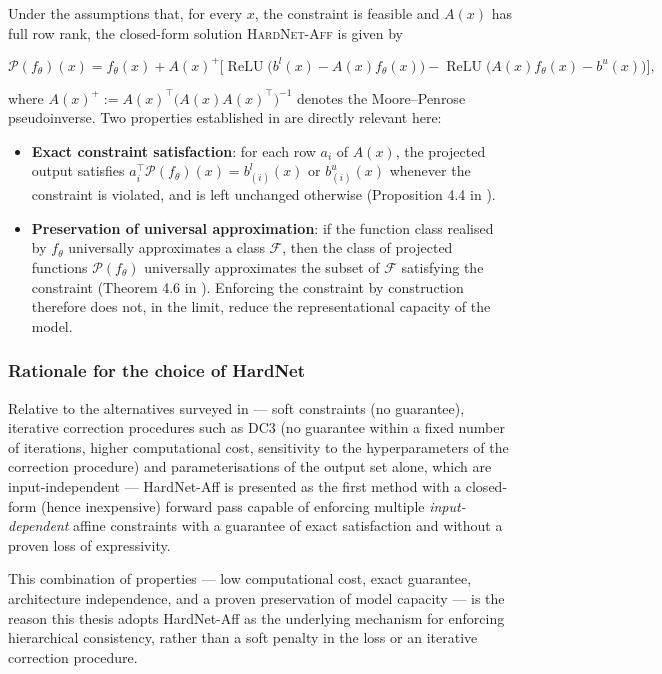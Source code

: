 Under the assumptions that, for every $x$, the constraint is feasible and $A(x)$ has full row rank, the closed-form solution \textsc{HardNet-Aff} is given by \cite{min2024hardnet}

\[
\mathcal{P}(f_\theta)(x)
=
f_\theta(x)
+
A(x)^{+}
\Big[
\operatorname{ReLU}\!\big(b^l(x)-A(x)f_\theta(x)\big)
-
\operatorname{ReLU}\!\big(A(x)f_\theta(x)-b^u(x)\big)
\Big],
\]

where $A(x)^{+}:=A(x)^{\top}\big(A(x)A(x)^{\top}\big)^{-1}$ denotes the Moore--Penrose pseudoinverse. Two properties established in \cite{min2024hardnet} are directly relevant here:

\begin{itemize}
    \item \textbf{Exact constraint satisfaction}: for each row $a_i$ of $A(x)$, the projected output satisfies $a_i^{\top}\mathcal{P}(f_\theta)(x)=b^l_{(i)}(x)$ or $b^u_{(i)}(x)$ whenever the constraint is violated, and is left unchanged otherwise (Proposition 4.4 in \cite{min2024hardnet}).
    \item \textbf{Preservation of universal approximation}: if the function class realised by $f_\theta$ universally approximates a class $\mathcal{F}$, then the class of projected functions $\mathcal{P}(f_\theta)$ universally approximates the subset of $\mathcal{F}$ satisfying the constraint (Theorem 4.6 in \cite{min2024hardnet}). Enforcing the constraint by construction therefore does not, in the limit, reduce the representational capacity of the model.
\end{itemize}

\subsubsection{Rationale for the choice of HardNet}

Relative to the alternatives surveyed in \cite{min2024hardnet} --- soft constraints (no guarantee), iterative correction procedures such as DC3 (no guarantee within a fixed number of iterations, higher computational cost, sensitivity to the hyperparameters of the correction procedure) and parameterisations of the output set alone, which are input-independent --- HardNet-Aff is presented as the first method with a closed-form (hence inexpensive) forward pass capable of enforcing multiple \emph{input-dependent} affine constraints with a guarantee of exact satisfaction and without a proven loss of expressivity.

This combination of properties --- low computational cost, exact guarantee, architecture independence, and a proven preservation of model capacity --- is the reason this thesis adopts HardNet-Aff as the underlying mechanism for enforcing hierarchical consistency, rather than a soft penalty in the loss or an iterative correction procedure.

